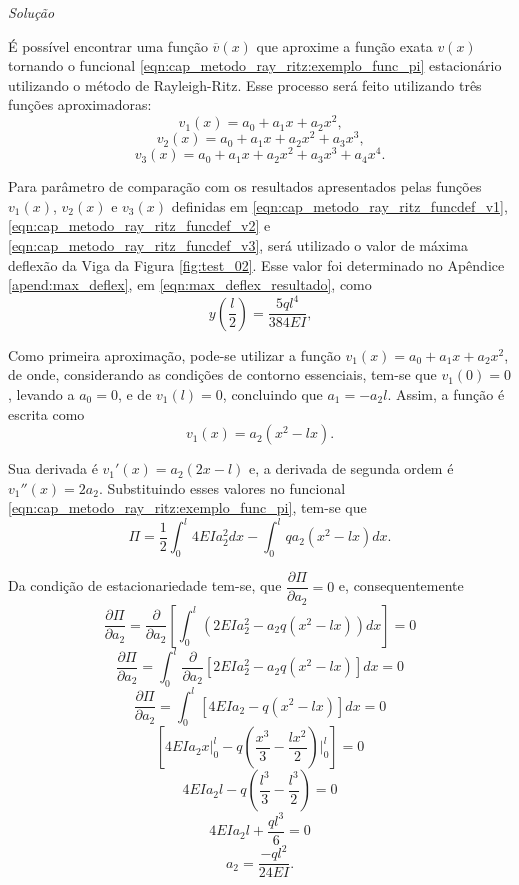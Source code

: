 \documentclass[
	12pt,				%
	openright,			%
    twoside,			%
	a4paper,			%
	english,			%
	french,				%
	spanish,			%
	brazil				%
	]{abntex2}
\makeatletter
\renewenvironment{proof}[1][\proofname]{
	\par\pushQED{\qed}%
	\normalfont \topsep6\p@\@plus6\p@\relax
	\trivlist
	\item\relax
		{\itshape
			#1\@addpunct{.}}\hspace\labelsep\ignorespaces
}{%
	\popQED\endtrivlist\@endpefalse
}
\newenvironment{solution}{
	\begin{proof}[Solução]
}{%
	\end{proof}
}
\numberwithin{lema}{chapter}
\numberwithin{teorema}{chapter}
\numberwithin{definicao}{chapter}
\numberwithin{exemplo}{chapter}
\numberwithin{figure}{chapter}
\makeatother
\begin{document}
\begin{solution}
	É possível encontrar uma função $\overline{v}(x)$ que aproxime a função exata $v(x)$ tornando o funcional \eqref{eqn:cap_metodo_ray_ritz:exemplo_func_pi} estacionário utilizando o método de Rayleigh-Ritz. Esse processo será feito utilizando três funções aproximadoras:
	\begin{equation}
		\label{eqn:cap_metodo_ray_ritz_funcdef_v1}
		v_1 (x) = a_0 + a_1 x + a_2 x^2
		\text{,}
	\end{equation}
	\begin{equation}
		\label{eqn:cap_metodo_ray_ritz_funcdef_v2}
		v_2 (x) = a_0 + a_1 x + a_2 x^2 + a_3 x^3
		\text{,}
	\end{equation}
	\begin{equation}
		\label{eqn:cap_metodo_ray_ritz_funcdef_v3}
		v_3 (x) = a_0 + a_1 x + a_2 x^2 + a_3 x^3 + a_4 x^4
		\text{.}
	\end{equation}
	
	Para parâmetro de comparação com os resultados apresentados pelas funções $v_1(x)$, $v_2(x)$ e $v_3(x)$ definidas em \eqref{eqn:cap_metodo_ray_ritz_funcdef_v1}, \eqref{eqn:cap_metodo_ray_ritz_funcdef_v2} e \eqref{eqn:cap_metodo_ray_ritz_funcdef_v3}, será utilizado o valor de máxima deflexão da Viga da Figura \ref{fig:test_02}. Esse valor foi determinado no Apêndice \ref{apend:max_deflex}, em \eqref{eqn:max_deflex_resultado}, como
	\begin{equation}
		\label{eqn:cap_metodo_ray_ritz:ex1_max_deflex_exato}
		y(\frac{l}{2})=\frac{5ql^4}{384EI}
		\text{,}
	\end{equation}
	
	Como primeira aproximação, pode-se utilizar a função $v_1(x)=a_0+a_1x+a_2x^2$, de onde, considerando as condições de contorno essenciais, tem-se que $v_1(0)=0$, levando a $a_0=0$, e de $v_1(l)=0$, concluindo que $a_1=-a_2l$. Assim, a função é escrita como
	$$
		v_1(x)=a_2(x^2-lx)
		\text{.}
	$$
	
	Sua derivada é $v_1'(x)=a_2(2x-l)$ e, a derivada de segunda ordem é $v_1''(x)=2a_2$. Substituindo esses valores no funcional \eqref{eqn:cap_metodo_ray_ritz:exemplo_func_pi}, tem-se que
	$$
		\Pi =
		\frac{1}{2}
		\int_0^l 4 EI a_2 ^2 dx
		-
		\int_0^l q a_2 (x^2-lx) dx
		\text{.}
	$$
	
	Da condição de estacionariedade tem-se, que $\dfrac{\partial \Pi}{\partial a_2} = 0$ e, consequentemente
	$$
		\frac{\partial \Pi}{\partial a_2}
		=
		\frac{\partial}{\partial a_2} \left [
			\int_0^l \left ( 2EIa_2 ^2 - a_2 q (x^2 -lx) \right ) dx
		\right]
		= 0
	$$
	$$
		\frac{\partial \Pi}{\partial a_2}
		=
		\int_0^l
			\frac{\partial}{\partial a_2} \left [
			2EIa_2^2 - a_2 q(x^2-lx)
		\right ] dx
		= 0
	$$
	$$
		\frac{\partial \Pi}{\partial a_2}
		=
		\int_0^l \left [
			4EIa_2 - q(x^2-lx)
		\right ] dx
		= 0
	$$
	$$
		\left [ 
			4EIa_2 x \Big |_0^l
			-
			q \left (
				\frac{x^3}{3} - \frac{lx^2}{2}
			\right ) \Big |_0^l
		\right ] 
		= 0
	$$
	$$
		4EIa_2l
		-
		q \left (\frac{l^3}{3} - \frac{l^3}{2} \right )
		= 0
	$$	
	$$
		4EIa_2l+\frac{ql^3}{6} = 0
	$$
	$$
		a_2=\frac{-ql^2}{24EI}\text{.}
	$$


\end{solution}
\end{document}
